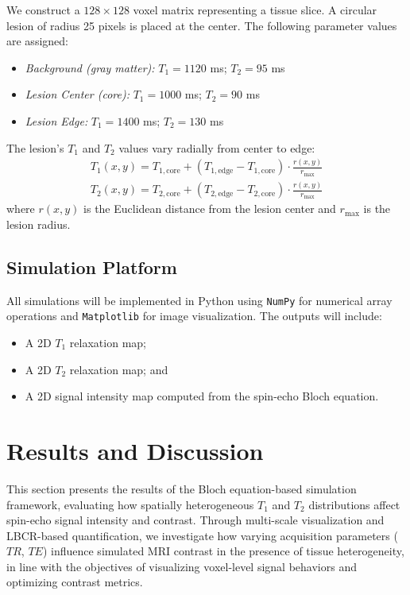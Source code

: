 \documentclass[10pt,a4paper,twoside]{article}
\begin{document}
We construct a \(128 \times 128\) voxel matrix representing a tissue slice. A circular lesion of radius 25 pixels is placed at the center. The following parameter values are assigned:

\begin{itemize}
    \item \textit{Background (gray matter):} \(T_1 = 1120\) ms; \(T_2 = 95\) ms
    \item \textit{Lesion Center (core):} \(T_1 = 1000\) ms; \(T_2 = 90\) ms
    \item \textit{Lesion Edge:} \(T_1 = 1400\) ms; \(T_2 = 130\) ms
\end{itemize}

\noindent The lesion's \(T_1\) and \(T_2\) values vary radially from center to edge:
\begin{align}
    T_1(x, y) = T_{1,\text{core}} + \left( T_{1,\text{edge}} - T_{1,\text{core}} \right) \cdot \frac{r(x, y)}{r_{\max}} \\
    T_2(x, y) = T_{2,\text{core}} + \left( T_{2,\text{edge}} - T_{2,\text{core}} \right) \cdot \frac{r(x, y)}{r_{\max}}
\end{align}
where \( r(x, y) \) is the Euclidean distance from the lesion center and \( r_{\max} \) is the lesion radius.

\subsection{Simulation Platform}

All simulations will be implemented in Python using \texttt{NumPy} for numerical array operations and \texttt{Matplotlib} for image visualization. The outputs will include:
\begin{itemize}
    \item A 2D \(T_1\) relaxation map;
    \item A 2D \(T_2\) relaxation map; and
    \item A 2D signal intensity map computed from the spin-echo Bloch equation.
\end{itemize}

\section{Results and Discussion}\label{sec:rnd}

This section presents the results of the Bloch equation-based simulation framework, evaluating how spatially heterogeneous \( T_1 \) and \( T_2 \) distributions affect spin-echo signal intensity and contrast. Through multi-scale visualization and LBCR-based quantification, we investigate how varying acquisition parameters (\( TR \), \( TE \)) influence simulated MRI contrast in the presence of tissue heterogeneity, in line with the objectives of visualizing voxel-level signal behaviors and optimizing contrast metrics.
\end{document}
